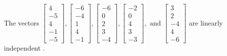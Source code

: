 \begin{exercise}
\begin{exerciseStatement}
  \end{exerciseStatement}
  \begin{exerciseAnswer}
   The vectors \(\left[\begin{array}{r}
4 \\
-5 \\
4 \\
-1 \\
-5
\end{array}\right] , \left[\begin{array}{r}
-6 \\
-4 \\
1 \\
4 \\
-1
\end{array}\right] , \left[\begin{array}{r}
-6 \\
0 \\
2 \\
3 \\
-4
\end{array}\right] , \left[\begin{array}{r}
-2 \\
0 \\
4 \\
3 \\
-3
\end{array}\right] , \text{ and } \left[\begin{array}{r}
3 \\
2 \\
-4 \\
4 \\
-6
\end{array}\right]\) are 
  	 linearly independent  .
  


  \end{exerciseAnswer}
\end{exercise}